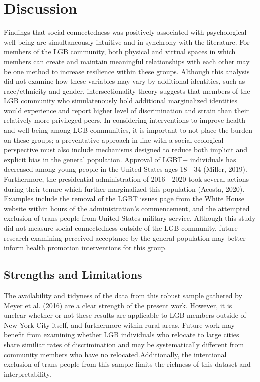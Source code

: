 \documentclass[
  english,
  man,floatsintext]{apa6}
\begin{document}
\hypertarget{htmlwidget-4d14c11ded899ad5f3a2}{}

\hypertarget{discussion}{%
\section{Discussion}\label{discussion}}

Findings that social connectedness was positively associated with psychological well-being are simultaneously intuitive and in synchrony with the literature. For members of the LGB community, both physical and virtual spaces in which members can create and maintain meaningful relationships with each other may be one method to increase resilience within these groups. Although this analysis did not examine how these variables may vary by additional identities, such as race/ethnicity and gender, intersectionality theory suggests that members of the LGB community who simulatenously hold additional marginalized identities would experience and report higher level of discrimination and strain than their relatively more privileged peers.
In considering interventions to improve health and well-being among LGB communities, it is important to not place the burden on these groups; a preventative approach in line with a social ecological perspective must also include mechanisms designed to reduce both implicit and explicit bias in the general population. Approval of LGBT+ individuals has decreased among young people in the United States ages 18 - 34 (Miller, 2019). Furthermore, the presidential administration of 2016 - 2020 took several actions during their tenure which further marginalized this population (Acosta, 2020). Examples include the removal of the LGBT issues page from the White House website within hours of the administration's commencement, and the attempted exclusion of trans people from United States military service. Although this study did not measure social connectedness outside of the LGB community, future research examining perceived acceptance by the general population may better inform health promotion interventions for this group.

\hypertarget{strengths-and-limitations}{%
\subsection{Strengths and Limitations}\label{strengths-and-limitations}}

The availability and tidyness of the data from this robust sample gathered by Meyer et al. (2016) are a clear strength of the present work. However, it is unclear whether or not these results are applicable to LGB members outside of New York City itself, and furthermore within rural areas. Future work may benefit from examining whether LGB individuals who relocate to large cities share similiar rates of discrimination and may be systematically different from community members who have no relocated.Additionally, the intentional exclusion of trans people from this sample limits the richness of this dataset and interpretability.
\newpage
\end{document}
